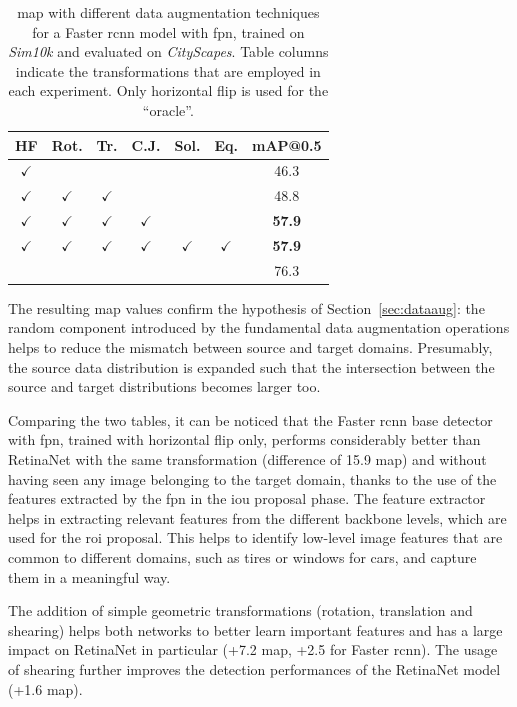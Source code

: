 \documentclass[%
    corpo=12pt,
    twoside,
    stile=classica,   
    tipotesi=magistrale,
    evenboxes,
    english,
	numerazioneromana,
]{toptesi}
\newcommand{\quotes}[1]{``#1''}
\begin{document}
\begin{table}[tb]
	\centering
	\caption{\gls{map} with different data augmentation techniques for a Faster \gls{rcnn} model with \gls{fpn}, trained on \textit{Sim10k} and evaluated on \textit{CityScapes}. Table columns indicate the transformations that are employed in each experiment. Only horizontal flip is used for the \quotes{oracle}.}
	\begin{NiceTabular}{ccccccc}
		\toprule
		HF & Rot. & Tr. & C.J. & Sol. & Eq. & mAP@0.5 \\
		\midrule
		$\checkmark$ & & & & & & 46.3   \\
		$\checkmark$ & $\checkmark$ & $\checkmark$ & & & & 48.8   \\
		$\checkmark$ & $\checkmark$ & $\checkmark$ & $\checkmark$ & & & \textbf{57.9}   \\
		$\checkmark$ & $\checkmark$ & $\checkmark$ & $\checkmark$ & $\checkmark$ & $\checkmark$ & \textbf{57.9}   \\
		\midrule
		 & & & & & & 76.3   \\
		\bottomrule
	\end{NiceTabular}
	\label{table:rand_fasterrcnn}
\end{table}

\bigskip
The resulting \gls{map} values confirm the hypothesis of Section~\ref{sec:dataaug}: the random component introduced by the fundamental data augmentation operations helps to reduce the mismatch between source and target domains. Presumably, the source data distribution is expanded such that the intersection between the source and target distributions becomes larger too.

\bigskip
Comparing the two tables, it can be noticed that the Faster \gls{rcnn} base detector with \gls{fpn}, trained with horizontal flip only, performs considerably better than RetinaNet with the same transformation (difference of 15.9 \gls{map}) and without having seen any image belonging to the target domain, thanks to the use of the features extracted by the \gls{fpn} in the \gls{iou} proposal phase. The feature extractor helps in extracting relevant features from the different backbone levels, which are used for the \gls{roi} proposal. This helps to identify low-level image features that are common to different domains, such as tires or windows for cars, and capture them in a meaningful way.

\medskip
The addition of simple geometric transformations (rotation, translation and shearing) helps both networks to better learn important features and has a large impact on RetinaNet in particular (+7.2 \gls{map}, +2.5 for Faster \gls{rcnn}). The usage of shearing further improves the detection performances of the RetinaNet model (+1.6 \gls{map}).
\end{document}
